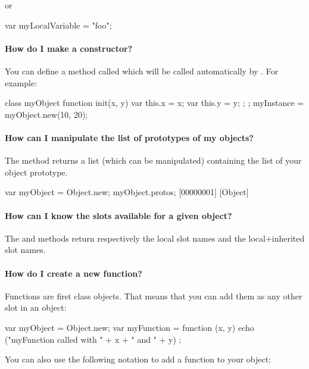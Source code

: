 \noindent
or

\begin{urbifixme}
var myLocalVariable = "foo";
\end{urbifixme}


\paragraph{How do I make a constructor?}
You can define a method called  which will be called
automatically by . For example:

\begin{urbifixme}
class myObject {
  function init(x, y) {
    var this.x = x;
    var this.y = y;
  };
};
myInstance = myObject.new(10, 20);
\end{urbifixme}


\paragraph{How can I manipulate the list of prototypes of my objects?}
The  method returns a list (which can be manipulated)
containing the list of your object prototype.

\begin{urbifixme}
var myObject = Object.new;
myObject.protos;
[00000001] [Object]
\end{urbifixme}

\paragraph{How can I know the slots available for a given object?}
The  and  methods return
respectively the local slot names and the local+inherited slot names.

\paragraph{How do I create a new function?}
Functions are first class objects. That means that you can add them as
any other slot in an object:

\begin{urbifixme}
var myObject = Object.new;
var myFunction = function (x, y)
  { echo ("myFunction called with " + x + " and " + y) };
\end{urbifixme}

You can also use the following notation to add a function to your
object:

